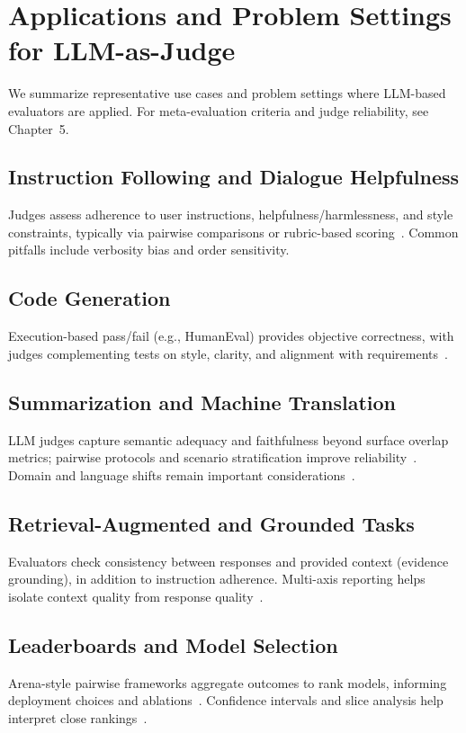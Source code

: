 \section{Applications and Problem Settings for LLM-as-Judge} %
We summarize representative use cases and problem settings where LLM-based evaluators are applied. For meta-evaluation criteria and judge reliability, see Chapter~5.

\subsection{Instruction Following and Dialogue Helpfulness}
Judges assess adherence to user instructions, helpfulness/harmlessness, and style constraints, typically via pairwise comparisons or rubric-based scoring~\cite{zheng2023judgelm, li2024_llmsasjudges}. Common pitfalls include verbosity bias and order sensitivity.

\subsection{Code Generation}
Execution-based pass/fail (e.g., HumanEval) provides objective correctness, with judges complementing tests on style, clarity, and alignment with requirements~\cite{chen2021evaluating, li2024_llmsasjudges}.

\subsection{Summarization and Machine Translation}
LLM judges capture semantic adequacy and faithfulness beyond surface overlap metrics; pairwise protocols and scenario stratification improve reliability~\cite{fu2023gptscore, liang2022helm}. Domain and language shifts remain important considerations~\cite{hada2024metal}.

\subsection{Retrieval-Augmented and Grounded Tasks}
Evaluators check consistency between responses and provided context (evidence grounding), in addition to instruction adherence. Multi-axis reporting helps isolate context quality from response quality~\cite{liang2022helm, li2024_llmsasjudges}.

\subsection{Leaderboards and Model Selection}
Arena-style pairwise frameworks aggregate outcomes to rank models, informing deployment choices and ablations~\cite{zheng2023judgelm}. Confidence intervals and slice analysis help interpret close rankings~\cite{bavaresco2024judgebench}.

